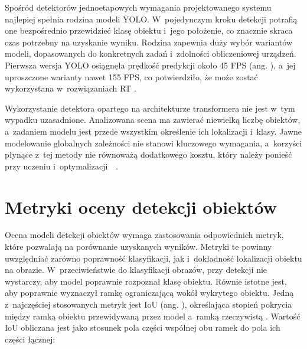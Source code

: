 Spośród detektorów jednoetapowych wymagania projektowanego systemu najlepiej spełnia rodzina modeli YOLO. W~pojedynczym kroku detekcji potrafią one bezpośrednio przewidzieć klasę obiektu i~jego położenie, co znacznie skraca czas potrzebny na uzyskanie wyniku. Rodzina zapewnia duży wybór wariantów modeli, dopasowanych do konkretnych zadań i~zdolności obliczeniowej urządzeń. Pierwsza wersja YOLO osiągnęła prędkość predykcji około 45 FPS (ang. ), a~jej uproszczone warianty nawet 155 FPS, co potwierdziło, że może zostać wykorzystana w~rozwiązaniach RT \cite{bib:redmon2016lookonceunifiedrealtime}.

Wykorzystanie detektora opartego na architekturze transformera nie jest w~tym wypadku uzasadnione. Analizowana scena ma zawierać niewielką liczbę obiektów, a~zadaniem modelu jest przede wszystkim określenie ich lokalizacji i~klasy. Jawne modelowanie globalnych zależności nie stanowi kluczowego wymagania, a~korzyści płynące z~tej metody nie równoważą dodatkowego kosztu, który należy ponieść przy uczeniu i~optymalizacji~~\cite{bib:carion2020endtoendobjectdetectiontransformers}.

\section{Metryki oceny detekcji obiektów}
\label{s:metryki}

Ocena modeli detekcji obiektów wymaga zastosowania odpowiednich metryk, które pozwalają na porównanie uzyskanych wyników. Metryki te powinny uwzględniać zarówno poprawność klasyfikacji, jak i~dokładność lokalizacji obiektu na obrazie. W~przeciwieństwie do klasyfikacji obrazów, przy detekcji nie wystarczy, aby model poprawnie rozpoznał klasę obiektu. Równie istotne jest, aby poprawnie wyznaczył ramkę ograniczającą wokół wykrytego obiektu. Jedną z~najczęściej stosowanych metryk jest IoU (ang. ), określająca stopień pokrycia między ramką obiektu przewidywaną przez model a~ramką rzeczywistą \cite{bib:detectionMetrics}. Wartość IoU obliczana jest jako stosunek pola części wspólnej obu ramek do pola ich części łącznej:

